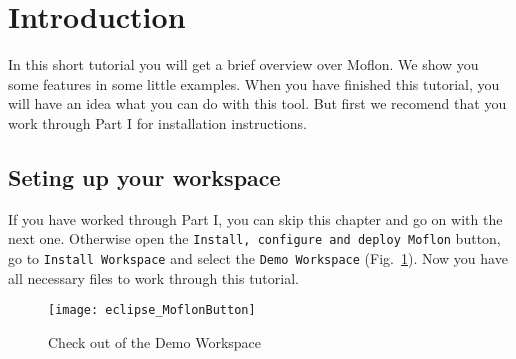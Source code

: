 \section{Introduction}
In this short tutorial you will get a brief overview over Moflon. We show you some features in some little examples. When you have finished this tutorial, you will have an idea what you can do with this tool.
\newline
But first we recomend that you work through Part I for installation instructions.

\subsection{Seting up your workspace}
If you have worked through Part I, you can skip this chapter and go on with the next one. Otherwise open the \texttt{Install, configure and deploy Moflon} button, go to \texttt{Install Workspace} and select the \texttt{Demo Workspace} (Fig.~\ref{demo_workspace}). Now you have all necessary files to work through this tutorial.

\begin{figure}[htbp]
	\centering
  \texttt{[image: eclipse\_MoflonButton]}
	\caption{Check out of the Demo Workspace} 
	\label{demo_workspace} 
\end{figure}